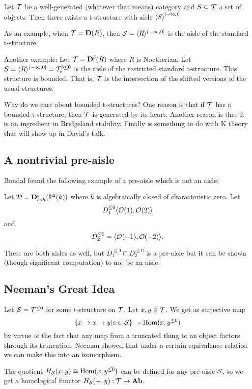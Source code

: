 \documentclass[12pt]{article}
\begin{document}
\begin{thm}[Neeman]
	Let $\mathcal{T}$ be a well-generated (whatever that means) category and $S\subseteq\mathcal{T}$ a set of objects. Then 
	there exists a t-structure with aisle $\langle \overline{S}\rangle^{(-\infty,0]}$
\end{thm}

As an example, when $\mathcal{T}=\mathbf{D}(R)$, then $\mathcal{S}=\langle \overline{R}\rangle^{(-\infty,0]}$ is the aisle of the standard t-structure.

Another example: Let $\mathcal{T}=\mathbf{D}^b(R)$ where $R$ is Noetherian. Let $S=\langle R\rangle^{(-\infty,0]}=\mathcal{T}_c^{b\le 0}$ is the aisle of the restricted standard t-structure.
This structure is bounded. That is, $\mathcal{T}$ is the intersection of the shifted versions of the usual structures.

Why do we care about bounded t-structures? One reason is that if $\mathcal{T}$ has a bounded t-structure, then $\mathcal{T}$ is generated by its heart. Another reason is that 
it is an ingredient in Bridgeland stability. Finally is something to do with K theory that will show up in David's talk.

\subsection{A nontrivial pre-aisle}
Bondal found the following example of a pre-aisle which is not an aisle:
\begin{ex}
	Let $\mathcal{D}=\mathbf{D}^b_{coh}(\mathbb{P}^2(k))$ where $k$ is algebraically closed of characteristic zero. Let 
	\[D_1^{\le 0}\langle \mathcal{O}(1),\mathcal{O}(2)\rangle\]
	and 
	\[D_2^{\le 0}=\langle\mathcal{O}(-1),\mathcal{O}(-2)\rangle.\]

	These are both aisles as well, but $D_1^{\le 0}\cap D_2^{\le 0}$ is a pre-aisle but it can be shown (though significant computation)
	to not be an aisle.
\end{ex}

\subsection{Neeman's Great Idea}
Let $\mathcal{S}=\mathcal{T}^{\le 0}$ for some t-structure on $\mathcal{T}$. Let $x,y\in\mathcal{T}$. We get as surjective map 
\[\left\{x\to x\to y|s\in\mathcal{S}\right\}\twoheadrightarrow\operatorname{Hom}(x,y^{\le 0})\]
by virtue of the fact that any map from a truncated thing to an object factors through its truncation. Neeman showed that under 
a certain equivalence relation we can make this into an isomorphism.

The quotient $H_{\mathcal{S}}(x,y)\cong\operatorname{Hom}(x,y^{\le 0})$ can be defined for any pre-aisle $\mathcal{S}$, so we get a homological functor 
$H_{\mathcal{S}}(-,y):\mathcal{T}\to\mathbf{Ab}$.
\end{document}
